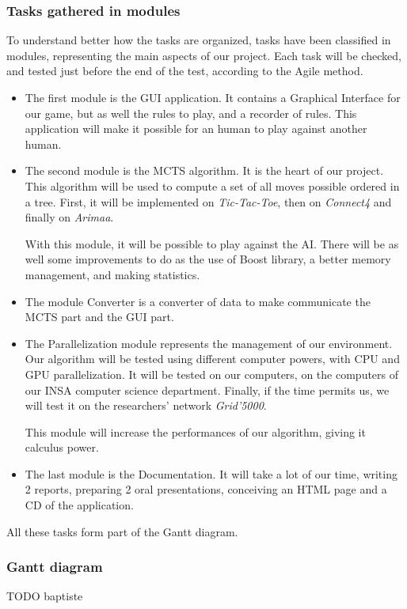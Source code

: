 \subsubsection{Tasks gathered in modules}

To understand better how the tasks are organized, tasks have been classified in modules, representing the main aspects of our project. Each task will be checked, and tested just before the end of the test, according to the Agile method.

\begin{itemize}
  \item The first module is the GUI application. It contains a Graphical Interface for our game, but as well the rules to play, and a recorder of rules. 
This application will make it possible for an human to play against another human.
  \item The second module is the MCTS algorithm. It is the heart of our project. This algorithm will be used to compute a set of all moves possible ordered in a tree. First, it will be implemented on \textit{Tic-Tac-Toe}, then on \textit{Connect4} and finally on \textit{Arimaa}. 

With this module, it will be possible to play against the AI.
There will be as well some improvements to do as the use of Boost library, a better memory management, and making statistics.
  \item The module Converter is a converter of data to make communicate the MCTS part and the GUI part.
  \item The Parallelization module represents the management of our environment. Our algorithm will be tested using different computer powers, with CPU and GPU parallelization. It will be tested on our computers, on the computers of our INSA computer science department. Finally, if the time permits us, we will test it on the researchers' network \textit{Grid'5000}. 

This module will increase the performances of our algorithm, giving it calculus power.
  \item The last module is the Documentation. It will take a lot of our time, writing 2 reports, preparing 2 oral presentations, conceiving an HTML page and a CD of the application.
\end{itemize}
All these tasks form part of the Gantt diagram.

\subsubsection{Gantt diagram}
TODO baptiste
